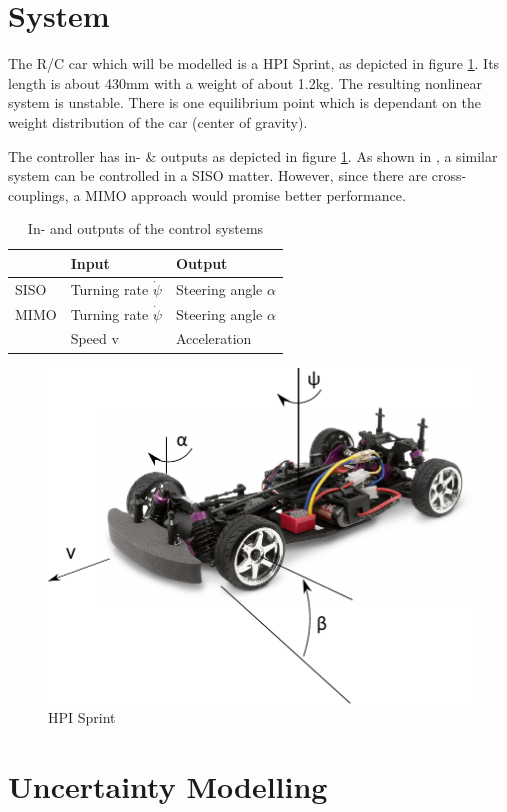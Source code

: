 \documentclass[conference]{IEEEtran}
\begin{document}
\section{System}

The R/C car which will be modelled is a HPI Sprint, as depicted in figure \ref{figure:hpi_:sprint}. Its length is about 430mm with a weight of about 1.2kg. The resulting nonlinear system is unstable. There is one equilibrium point which is dependant on the weight distribution of the car (center of gravity). 


The controller has in- \& outputs as depicted in figure \ref{figure:controlinout}. As shown in \cite{bib:arndt}, a similar system can be controlled in a SISO matter. However, since there are cross-couplings, a MIMO approach would promise better performance.

\begin{table}[h]
\begin{center}
\begin{tabular}{|l||l|l|}
\hline
 		& Input 		& Output\\
\hline
SISO 	& Turning rate $\dot{\psi}$ 	& Steering angle $\alpha$\\
\hline
MIMO 	& Turning rate $\dot{\psi}$ 	& Steering angle $\alpha$\\
     	& Speed v 		& Acceleration\\
\hline
\end{tabular}
\caption{In- and outputs of the control systems}  
\label{figure:controlinout}
\end{center}
\end{table}



\begin{figure}[h!]
\centering
  \includegraphics[width=.3\textwidth]{pics/hpisprintgeom.pdf} 
  \caption{HPI Sprint}  
  \label{figure:hpi_:sprint}
\end{figure}

 
\section{Uncertainty Modelling}
\end{document}
